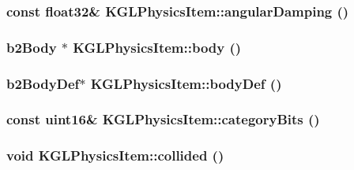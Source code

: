 \begin{CompactItemize}
{\subsubsection[{angularDamping}]{\setlength{\rightskip}{0pt plus 5cm}const float32\& KGLPhysicsItem::angularDamping ()}}
\label{class_k_g_l_physics_item_faf0f2e3fd56195ce1e165b5f206855a}


\hypertarget{class_k_g_l_physics_item_1d2f1900e5bd95ac3699f42e8b8b9710}{
\subsubsection[{body}]{\setlength{\rightskip}{0pt plus 5cm}b2Body $\ast$ KGLPhysicsItem::body ()}}
\label{class_k_g_l_physics_item_1d2f1900e5bd95ac3699f42e8b8b9710}


\hypertarget{class_k_g_l_physics_item_384af73ef980d7404c4e4cf4332bb332}{
\subsubsection[{bodyDef}]{\setlength{\rightskip}{0pt plus 5cm}b2BodyDef$\ast$ KGLPhysicsItem::bodyDef ()}}
\label{class_k_g_l_physics_item_384af73ef980d7404c4e4cf4332bb332}


\hypertarget{class_k_g_l_physics_item_870ea0d4451995acf418807dd535d82d}{
\subsubsection[{categoryBits}]{\setlength{\rightskip}{0pt plus 5cm}const uint16\& KGLPhysicsItem::categoryBits ()}}
\label{class_k_g_l_physics_item_870ea0d4451995acf418807dd535d82d}


\hypertarget{class_k_g_l_physics_item_27a5f89aa48c78f0c3c18b20964eba24}{
\subsubsection[{collided}]{\setlength{\rightskip}{0pt plus 5cm}void KGLPhysicsItem::collided ()}}
\label{class_k_g_l_physics_item_27a5f89aa48c78f0c3c18b20964eba24}



\end{CompactItemize}
